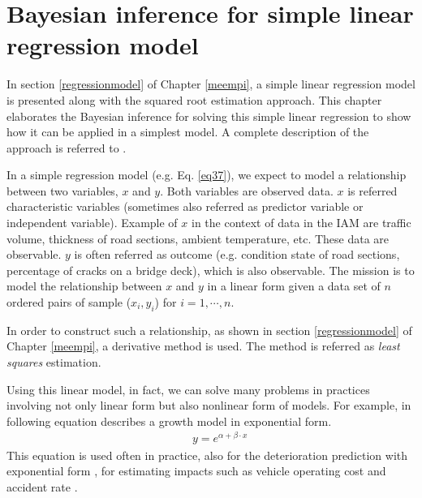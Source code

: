

\section{Bayesian inference for simple linear regression model} \label{bayline}
In section \ref{regressionmodel} of Chapter \ref{meempi}, a simple linear regression model is presented along with the squared root estimation approach. This chapter elaborates the Bayesian inference for solving this simple linear regression to show how it can be applied in a simplest model. A complete description of the approach is referred to \cite{Bolstad2007}.

In a simple regression model (e.g. Eq. \eqref{eq37}), we expect to model a relationship between two variables, $x$ and $y$. Both variables are observed data. $x$ is referred characteristic variables (sometimes also referred as predictor variable or independent variable). Example of $x$ in the context of data in the IAM are traffic volume, thickness of road sections, ambient temperature, etc. These data are observable. $y$ is often referred as outcome (e.g. condition state of road sections, percentage of cracks on a bridge deck), which is also observable. The mission is to model the relationship between $x$ and $y$ in a linear form given a data set of $n$ ordered pairs of sample ($x_i,y_i$) for $i=1,\cdots,n$. 

In order to construct such a relationship, as shown in section \ref{regressionmodel} of Chapter \ref{meempi}, a derivative method is used. The method is referred as \textit{least squares} estimation. 

Using this linear model, in fact, we can solve many problems in practices involving not only linear form but also nonlinear form of models. For example, in following equation describes a growth model in exponential form.
%
\begin{eqnarray}
&& y=e^{\alpha+\beta\cdot x}\label{bayes7}
\end{eqnarray}
%
This equation is used often in practice, also for the deterioration prediction with exponential form \citep{Lethanh2013b,Lethanh2015b}, for estimating impacts such as vehicle operating cost \citep{OpusCL1999} and  accident rate \citep{Kumares2007}.

